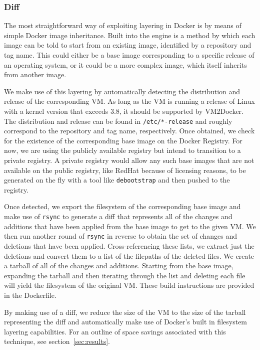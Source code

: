 \documentclass[\myfontsize, letterpaper]{article}
\newcommand{\projectname}{VM2Docker}
\begin{document}
\subsubsection{Diff}
The most straightforward way of exploiting layering in Docker is by means of simple Docker image inheritance. Built into the engine is a method by which each image can be told to start from an existing image, identified by a repository and tag name. This could either be a base image corresponding to a specific release of an operating system, or it could be a more complex image, which itself inherits from another image. 

We make use of this layering by automatically detecting the distribution and release of the corresponding VM. As long as the VM is running a release of Linux with a kernel version that exceeds 3.8, it should be supported by \projectname. The distribution and release can be found in \texttt{/etc/*-release} and roughly correspond to the repository and tag name, respectively. Once obtained, we check for the existence of the corresponding base image on the Docker Registry. For now, we are using the publicly available registry but intend to transition to a private registry. A private registry would allow any such base images that are not available on the public registry, like RedHat because of licensing reasons, to be generated on the fly with a tool like \texttt{debootstrap}\cite{debootstrap} and then pushed to the registry.

Once detected, we export the filesystem of the corresponding base image and make use of \texttt{rsync} to generate a diff that represents all of the changes and additions that have been applied from the base image to get to the given VM. We then run another round of \texttt{rsync} in reverse to obtain the set of changes and deletions that have been applied. Cross-referencing these lists, we extract just the deletions and convert them to a list of the filepaths of the deleted files. We create a tarball of all of the changes and additions. Starting from the base image, expanding the tarball and then iterating through the list and deleting each file will yield the filesystem of the original VM. These build instructions are provided in the Dockerfile. 

By making use of a diff, we reduce the size of the VM to the size of the tarball representing the diff and automatically make use of Docker's built in filesystem layering capabilities. For an outline of space savings associated with this technique, see section~\ref{sec:results}.
\end{document}
